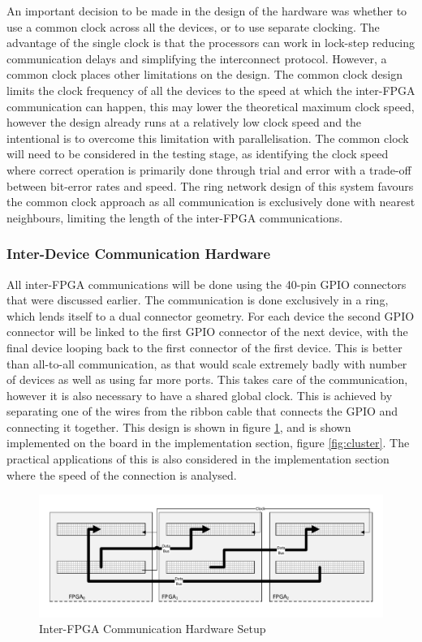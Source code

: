 An important decision to be made in the design of the hardware was whether to use a common clock across all the devices, or to use separate clocking. The advantage of the single clock is that the processors can work in lock-step reducing communication delays and simplifying the interconnect protocol. However, a common clock places other limitations on the design. The common clock design limits the clock frequency of all the devices to the speed at which the inter-FPGA communication can happen, this may lower the theoretical maximum clock speed, however the design already runs at a relatively low clock speed and the intentional is to overcome this limitation with parallelisation. The common clock will need to be considered in the testing stage, as identifying the clock speed where correct operation is primarily done through trial and error with a trade-off between bit-error rates and speed. The ring network design of this system favours the common clock approach as all communication is exclusively done with nearest neighbours, limiting the length of the inter-FPGA communications. 

\subsubsection{Inter-Device Communication Hardware}
All inter-FPGA communications will be done using the 40-pin GPIO connectors that were discussed earlier. The communication is done exclusively in a ring, which lends itself to a dual connector geometry. For each device the second GPIO connector will be linked to the first GPIO connector of the next device, with the final device looping back to the first connector of the first device. This is better than all-to-all communication, as that would scale extremely badly with number of devices as well as using far more ports. This takes care of the communication, however it is also necessary to have a shared global clock. This is achieved by separating one of the wires from the ribbon cable that connects the GPIO and connecting it together. This design is shown in figure \ref{fig:interfpga}, and is shown implemented on the board in the implementation section, figure \ref{fig:cluster}. The practical applications of this is also considered in the implementation section where the speed of the connection is analysed. 

\begin{figure}[h!]
  \includegraphics[width=\textwidth]{./figs/interfpga.pdf}
  \caption{Inter-FPGA Communication Hardware Setup}
  \label{fig:interfpga}
\end{figure}

